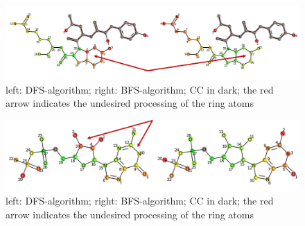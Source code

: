 \begin{figure}

\includegraphics[scale=0.5]{2ring_example}\caption{left: DFS-algorithm; right: BFS-algorithm; CC in dark; the
red arrow indicates the undesired processing of the ring atoms}
\label{fig:2ring_example}
\end{figure}

\begin{figure}

\includegraphics[scale=0.5]{2ring_example2}\caption{left: DFS-algorithm; right: BFS-algorithm; CC in dark; the
red arrow indicates the undesired processing of the ring atoms}
\label{fig:2ring_example2}
\end{figure}
